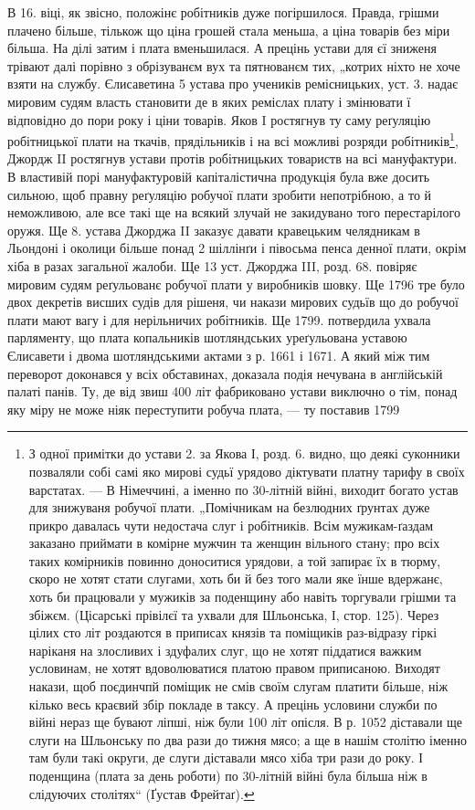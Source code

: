 В 16. віці, як звісно, положінє робітників дуже погіршилося.
Правда, грішми плачено більше, тількож що ціна
грошей стала меньша, а ціна товарів без міри більша. На
ділі затим і плата вменьшилася. А прецінь устави для єї
зниженя трівают далі порівно з обрізуванєм вух та пятнованєм
тих, „котрих ніхто не хоче взяти на службу. Єлисаветина
5 устава про учеників ремісницьких, уст. 3. надає
мировим судям власть становити де в яких реміслах плату
і змінювати ї відповідно до пори року і ціни товарів. Яков
I ростягнув ту саму реґуляцію робітницької плати на ткачів,
прядільників і на всі можливі розряди робітників\footnote{
З одної примітки до устави 2. за Якова І, розд. 6. видно, що
деякі суконники позваляли собі самі яко мирові судьї урядово діктувати
платну тарифу в своїх варстатах. — В Німеччині, а іменно по 30-літній
війні, виходит богато устав для знижуваня робучої плати. „Помічникам
на безлюдних ґрунтах дуже прикро давалась чути недостача слуг і робітників.
Всім мужикам-ґаздам заказано приймати в комірне мужчин та
женщин вільного стану; про всіх таких комірників повинно доноситися
урядови, а той запирає їх в тюрму, скоро не хотят стати слугами, хоть би
й без того мали яке їнше вдержанє, хоть би працювали у  мужиків за поденщину
або навіть торгували грішми та збіжєм. (Цісарські прівілєї та
ухвали для Шльонська, І, стор. 125). Через цілих сто літ роздаются в приписах
князів та поміщиків раз-відразу гіркі наріканя на злосливих
і здуфалих слуг, що не хотят піддатися важким условинам, не хотят вдоволюватися
платою правом приписаною. Виходят накази, щоб поєдинчпй
поміщик не смів своїм слугам платити більше, ніж кілько весь краєвий
збір покладе в таксу. А прецінь условини служби по війні нераз ще
бувают ліпші, ніж були 100 літ опісля. В р. 1052 діставали ще слуги на
Шльонську по два рази до тижня мясо; а ще в нашім столітю іменно
там були такі округи, де слуги діставали мясо хіба три рази до року.
І поденщина (плата за день роботи) по 30-літній війні була більша ніж
в слідуючих столітях“ (Ґустав Фрейтаґ).
}, Джордж
II ростягнув устави протів робітницьких товариств на всі
мануфактури. В властивій порі мануфактуровій капіталістична
продукція була вже досить сильною, щоб правну
реґуляцію робучої плати зробити непотрібною, а то й неможливою,
але все такі ще на всякий злучай не закидувано
того перестарілого оружя. Ще 8. устава Джорджа II заказує
давати кравецьким челядникам в Льондоні і околици більше
понад 2 шіллінґи і півосьма пенса денної плати, окрім хіба
в разах загальної жалоби. Ще 13 уст. Джорджа III, розд.
68. повіряє мировим судям реґульованє робучої плати у виробників
шовку. Ще 1796 тре було двох декретів висших
судів для рішеня, чи накази мирових судьїв що до робучої
плати мают вагу і для нерільничих робітників. Ще 1799.
потвердила ухвала парляменту, що плата копальників шотляндських
уреґульована уставою Єлисавети і двома шотляндськими
актами з р. 1661 і 1671. А який між тим переворот
доконався у всіх обставинах, доказала подія нечувана
в англійській палаті панів. Ту, де від звиш 400 літ
фабриковано устави виключно о тім, понад яку міру не
може ніяк переступити робуча плата, — ту поставив 1799
\parbreak{}
